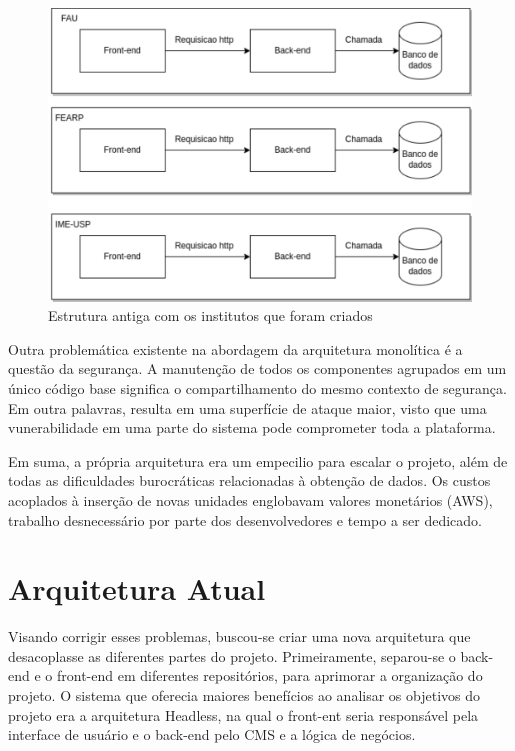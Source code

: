 \documentclass[12pt,twoside,english,brazilian]{article}
\begin{document}
\begin{figure}
    \centering
    \includegraphics[width=1\linewidth]{figuras/arqtuitera_antiga_institutos.pdf}
    \caption{Estrutura antiga com os institutos que foram criados}
    \label{fig:arquitetura-antiga}
\end{figure}

Outra problemática existente na abordagem da arquitetura monolítica é a questão da segurança. A manutenção de todos os componentes agrupados em um único código base significa o compartilhamento do mesmo contexto de segurança. Em outra palavras, resulta em uma superfície de ataque maior, visto que uma vunerabilidade em uma parte do sistema pode comprometer toda a plataforma.

Em suma, a própria arquitetura era um empecilio para escalar o projeto, além de todas as dificuldades burocráticas relacionadas à obtenção de dados. Os custos acoplados à inserção de novas unidades englobavam valores monetários (AWS), trabalho desnecessário por parte dos desenvolvedores e tempo a ser dedicado. 


\section{Arquitetura Atual}

Visando corrigir esses problemas, buscou-se criar uma nova arquitetura que desacoplasse as diferentes partes do projeto. Primeiramente, separou-se o back-end e o front-end em diferentes repositórios, para aprimorar a organização do projeto. O sistema que oferecia maiores benefícios ao analisar os objetivos do projeto era a arquitetura Headless, na qual o front-ent seria responsável pela interface de usuário e o back-end pelo CMS e a lógica de negócios.
\end{document}
